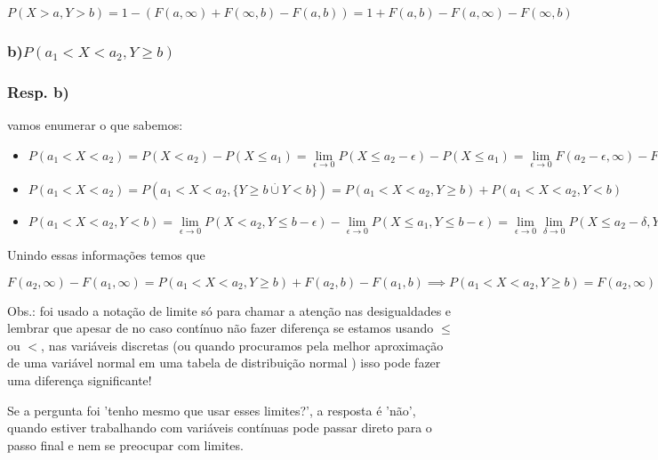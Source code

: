 \documentclass[portuguese]{article}
\begin{document}
$P(X>a,Y>b)=1-(F(a,\infty)+F(\infty,b)-F(a,b))=1+F(a,b)-F(a,\infty)-F(\infty,b)$


\subsubsection*{\textmd{b)$P(a_{1}<X<a_{2},Y\geq b)$}}


\subsubsection*{\textmd{Resp. b)}}

vamos enumerar o que sabemos:
\begin{itemize}
\item $P(a_{1}<X<a_{2})=P(X<a_{2})-P(X\leq a_{1})=\underset{\epsilon\rightarrow0}{\lim}P(X\leq a_{2}-\epsilon)-P(X\leq a_{1})=\underset{\epsilon\rightarrow0}{\lim}F(a_{2}-\epsilon,\infty)-F(a_{1},\infty)=F(a_{2},\infty)-F(a_{1},\infty)$
\item $P(a_{1}<X<a_{2})=P(a_{1}<X<a_{2},\{Y\geq b\overset{.}{\cup}Y<b\})=P(a_{1}<X<a_{2},Y\geq b)+P(a_{1}<X<a_{2},Y<b)$
\item $P(a_{1}<X<a_{2},Y<b)=\underset{\epsilon\rightarrow0}{\lim}P(X<a_{2},Y\leq b-\epsilon)-\underset{\epsilon\rightarrow0}{\lim}P(X\leq a_{1},Y\leq b-\epsilon)=\underset{\epsilon\rightarrow0}{\lim}\underset{\delta\rightarrow0}{\lim}P(X\leq a_{2}-\delta,Y\leq b-\epsilon)-\underset{\epsilon\rightarrow0}{\lim}P(X\leq a_{1},Y\leq b-\epsilon)=\underset{\epsilon\rightarrow0}{\lim}\underset{\delta\rightarrow0}{\lim}F(a_{2}-\delta,b-\epsilon)-\underset{\epsilon\rightarrow0}{\lim}F(a_{1},b-\epsilon)=F(a_{2},b)-F(a_{1},b)$
\end{itemize}
Unindo essas informações temos que

$F(a_{2},\infty)-F(a_{1},\infty)=P(a_{1}<X<a_{2},Y\geq b)+F(a_{2},b)-F(a_{1},b)\implies P(a_{1}<X<a_{2},Y\geq b)=F(a_{2},\infty)-F(a_{1},\infty)-F(a_{2},b)+F(a_{1},b)$

\textbf{\textcompwordmark{}}

Obs.: foi usado a notação de limite só para chamar a atenção nas desigualdades
e lembrar que apesar de no caso contínuo não fazer diferença se estamos
usando $\leq$ ou $<$, nas variáveis discretas (ou quando procuramos
pela melhor aproximação de uma variável normal em uma tabela de distribuição
normal ) isso pode fazer uma diferença significante!

Se a pergunta foi 'tenho mesmo que usar esses limites?', a resposta
é 'não', quando estiver trabalhando com variáveis contínuas pode passar
direto para o passo final e nem se preocupar com limites.
\end{document}
